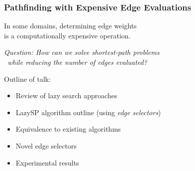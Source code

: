 \begin{frame}
   \frametitle{Pathfinding with Expensive Edge Evaluations}
   
   In some domains, determining edge weights\\
   is a computationally expensive operation.
   
   \pause
   \vspace{0.4cm}
   \emph{Question: How can we solve shortest-path problems\\
      \quad \quad \quad \quad \, while reducing the number of edges evaluated?}
   
   \pause
   \vspace{0.4cm}
   Outline of talk:
   \begin{itemize}
   \pause
   \item Review of lazy search approaches
   \pause
   \item LazySP algorithm outline (using \emph{edge selectors})
   \pause
   \item Equivalence to existing algorithms
   \pause
   \item Novel edge selectors
   \pause
   \item Experimental results
   \end{itemize}
\end{frame}

